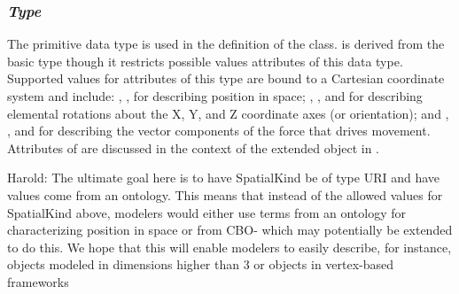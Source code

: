 %
%

\subsubsection{\emph{Type} }
\label{dat:SpatialKind}

The  primitive data type is used in the definition of the \SpatialComponent class.  is derived from the basic  type  though it restricts possible values attributes of this data type. Supported values for attributes of this type are bound to a Cartesian coordinate system and include: , ,  for describing position in space; , , and  for describing elemental rotations about the X, Y, and Z coordinate axes (or orientation); and , , and  for describing the vector components of the force that drives movement. Attributes of  are discussed in the context of the extended \Compartment object in .

{\color{red} Harold: \notice The ultimate goal here is to have SpatialKind be of type URI and have values come from an ontology. This means that instead of the allowed values for SpatialKind above, modelers would either use terms from an ontology for characterizing position in space or from CBO- which may potentially be extended to do this. We hope that this will enable modelers to easily describe, for instance, objects modeled in dimensions higher than 3 or objects in vertex-based frameworks}

